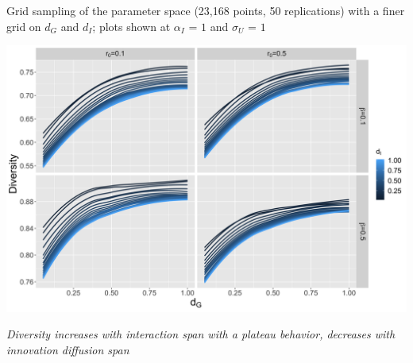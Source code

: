 {Grid sampling of the parameter space (23,168 points, 50 replications) with a finer grid on $d_G$ and $d_I$; plots shown at $\alpha_I \textrm{ = } 1$ and $\sigma_U \textrm{ = } 1$

\medskip

\begin{center}
\includegraphics[width=0.7\linewidth]{figures/averageDiversity-gravityDecay_color-innovationDecay_facet-mutationRate-earlyAdoptersRate_newInnovationHierarchy1_utilityStd1_distriblog-normal}
\end{center}

\smallskip

\footnotesize
\textit{Diversity increases with interaction span with a plateau behavior, decreases with innovation diffusion span}

}


